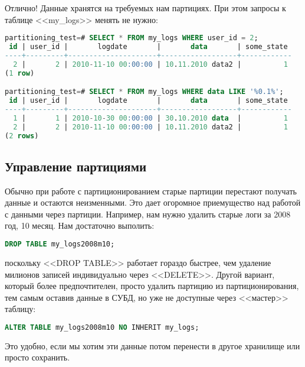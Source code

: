 Отлично! Данные хранятся на требуемых нам партициях. При этом запросы к таблице <<my\_logs>> менять не нужно:
\begin{lstlisting}[language=SQL,label=lst:partitioning11,caption=Проверка запросов]
partitioning_test=# SELECT * FROM my_logs WHERE user_id = 2;
 id | user_id |       logdate       |       data       | some_state 
----+---------+---------------------+------------------+------------
  2 |       2 | 2010-11-10 00:00:00 | 10.11.2010 data2 |          1
(1 row)

partitioning_test=# SELECT * FROM my_logs WHERE data LIKE '%0.1%';
 id | user_id |       logdate       |       data       | some_state 
----+---------+---------------------+------------------+------------
  1 |       1 | 2010-10-30 00:00:00 | 30.10.2010 data  |          1
  2 |       2 | 2010-11-10 00:00:00 | 10.11.2010 data2 |          1
(2 rows)
\end{lstlisting}

\subsection{Управление партициями}
Обычно при работе с партиционированием старые партиции перестают получать данные и остаются неизменными. 
Это дает огоромное приемущество над работой с данными через партиции. 
Например, нам нужно удалить старые логи за 2008 год, 10 месяц. Нам достаточно выполить:
\begin{lstlisting}[language=SQL,label=lst:partitioning12,caption=Чистка логов]
DROP TABLE my_logs2008m10;
\end{lstlisting}
поскольку <<DROP TABLE>> работает гораздо быстрее, чем удаление милионов записей индивидуально через <<DELETE>>.
Другой вариант, который более предпочтителен, просто удалить партицию из партиционирования, 
тем самым оставив данные в СУБД, но уже не доступные через <<мастер>> таблицу: 
\begin{lstlisting}[language=SQL,label=lst:partitioning13,caption=Удаляем партицию из партиционирования]
ALTER TABLE my_logs2008m10 NO INHERIT my_logs; 
\end{lstlisting}
Это удобно, если мы хотим эти данные потом перенести в другое хранилище или просто сохранить.


